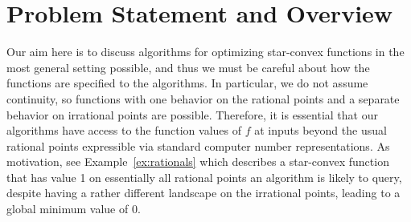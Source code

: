 \documentclass[11pt,letter]{article}
\numberwithin{nTheorems}{section}
\begin{document}
\section{Problem Statement and Overview}
\label{sec:Statement}


Our aim here is to discuss algorithms for optimizing star-convex functions in the most general setting possible, and thus we must be careful about how the functions are specified to the algorithms.
In particular, we do not assume continuity, so functions with one behavior on the rational points and a separate behavior on irrational points are possible. Therefore, it is essential that our algorithms have access to the function values of $f$ at inputs beyond the usual rational points expressible via standard computer number representations.
As motivation, see Example~\ref{ex:rationals}
which describes a star-convex function that has value 1 on essentially all rational points an algorithm is likely to query, despite having a rather different landscape on the irrational points, leading to a global minimum value of 0.
\end{document}
